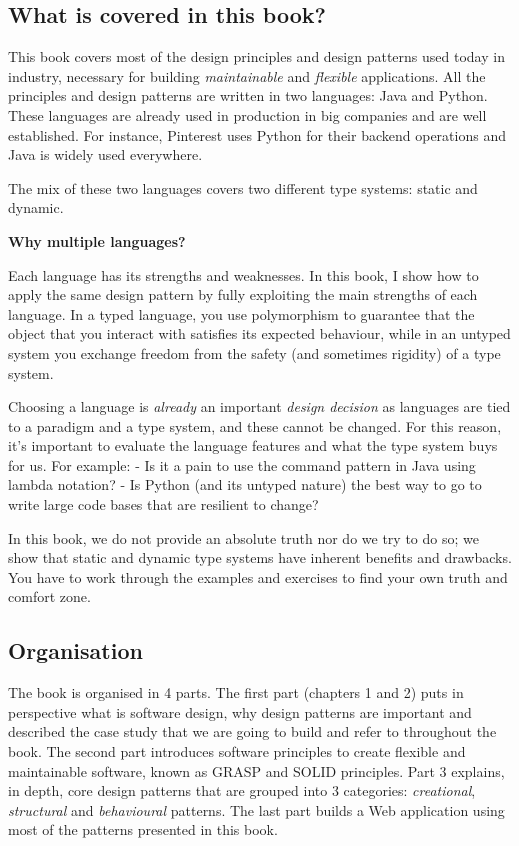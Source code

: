 \documentclass[]{article}
\begin{document}
\subsection{What is covered in this
book?}\label{what-is-covered-in-this-book}

This book covers most of the design principles and design patterns used
today in industry, necessary for building \emph{maintainable} and
\emph{flexible} applications. All the principles and design patterns are
written in two languages: Java and Python. These languages are already
used in production in big companies and are well established. For
instance, Pinterest uses Python for their backend operations and Java is
widely used everywhere.

The mix of these two languages covers two different type systems: static
and dynamic.

\textbf{Why multiple languages?}

Each language has its strengths and weaknesses. In this book, I show how
to apply the same design pattern by fully exploiting the main strengths
of each language. In a typed language, you use polymorphism to guarantee
that the object that you interact with satisfies its expected behaviour,
while in an untyped system you exchange freedom from the safety (and
sometimes rigidity) of a type system.

Choosing a language is \emph{already} an important \emph{design
decision} as languages are tied to a paradigm and a type system, and
these cannot be changed. For this reason, it's important to evaluate the
language features and what the type system buys for us. For example: -
Is it a pain to use the command pattern in Java using lambda notation? -
Is Python (and its untyped nature) the best way to go to write large
code bases that are resilient to change?

In this book, we do not provide an absolute truth nor do we try to do
so; we show that static and dynamic type systems have inherent benefits
and drawbacks. You have to work through the examples and exercises to
find your own truth and comfort zone.

\subsection{Organisation}\label{organisation}

The book is organised in 4 parts. The first part (chapters 1 and 2) puts
in perspective what is software design, why design patterns are
important and described the case study that we are going to build and
refer to throughout the book. The second part introduces software
principles to create flexible and maintainable software, known as GRASP
and SOLID principles. Part 3 explains, in depth, core design patterns
that are grouped into 3 categories: \emph{creational}, \emph{structural}
and \emph{behavioural} patterns. The last part builds a Web application
using most of the patterns presented in this book.
\end{document}
